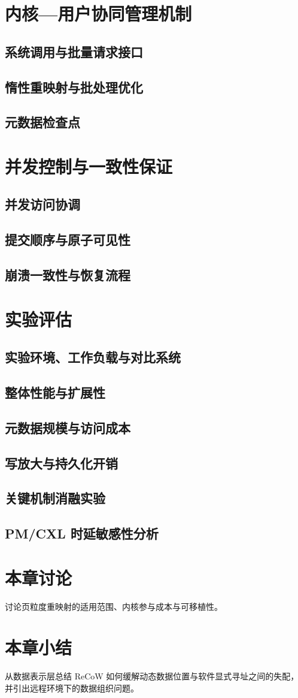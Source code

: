\section{内核—用户协同管理机制}
\subsection{系统调用与批量请求接口}
\subsection{惰性重映射与批处理优化}
\subsection{元数据检查点}

\section{并发控制与一致性保证}
\subsection{并发访问协调}
\subsection{提交顺序与原子可见性}
\subsection{崩溃一致性与恢复流程}

\section{实验评估}
\subsection{实验环境、工作负载与对比系统}
\subsection{整体性能与扩展性}
\subsection{元数据规模与访问成本}
\subsection{写放大与持久化开销}
\subsection{关键机制消融实验}
\subsection{PM/CXL 时延敏感性分析}

\section{本章讨论}
讨论页粒度重映射的适用范围、内核参与成本与可移植性。
\section{本章小结}
从数据表示层总结 ReCoW 如何缓解动态数据位置与软件显式寻址之间的失配，并引出远程环境下的数据组织问题。
